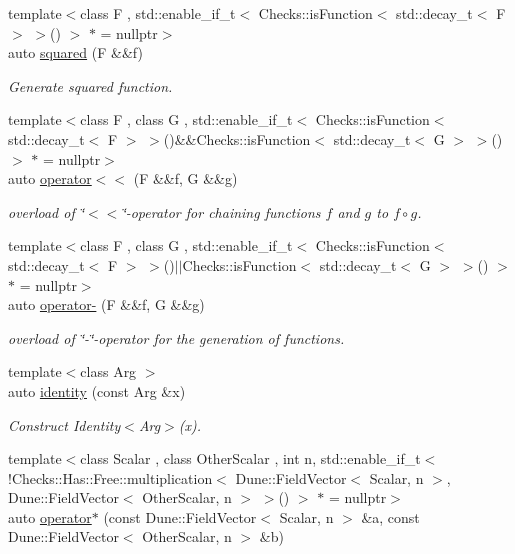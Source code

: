 \begin{DoxyCompactItemize}
{\footnotesize template$<$class F , std\-::enable\-\_\-if\-\_\-t$<$ Checks\-::is\-Function$<$ std\-::decay\-\_\-t$<$ F $>$ $>$() $>$ $\ast$  = nullptr$>$ }\\auto \hyperlink{namespaceFunG_ac4ffc0754104af6ddf114e154251db78}{squared} (F \&\&f)
\begin{DoxyCompactList}\small\item\em Generate squared function. \end{DoxyCompactList}\item 
{\footnotesize template$<$class F , class G , std\-::enable\-\_\-if\-\_\-t$<$ Checks\-::is\-Function$<$ std\-::decay\-\_\-t$<$ F $>$ $>$()\&\&\-Checks\-::is\-Function$<$ std\-::decay\-\_\-t$<$ G $>$ $>$() $>$ $\ast$  = nullptr$>$ }\\auto \hyperlink{namespaceFunG_a65436d4494e99629b0177d0df7634a6b}{operator$<$$<$} (F \&\&f, G \&\&g)
\begin{DoxyCompactList}\small\item\em overload of \char`\"{}$<$$<$\char`\"{}-\/operator for chaining functions $f$ and $g$ to $ f \circ g $. \end{DoxyCompactList}\item 
{\footnotesize template$<$class F , class G , std\-::enable\-\_\-if\-\_\-t$<$ Checks\-::is\-Function$<$ std\-::decay\-\_\-t$<$ F $>$ $>$()$\vert$$\vert$\-Checks\-::is\-Function$<$ std\-::decay\-\_\-t$<$ G $>$ $>$() $>$ $\ast$  = nullptr$>$ }\\auto \hyperlink{namespaceFunG_a3af04c2ef5c1b206feb75fffd298cbbf}{operator-\/} (F \&\&f, G \&\&g)
\begin{DoxyCompactList}\small\item\em overload of \char`\"{}-\/\char`\"{}-\/operator for the generation of functions. \end{DoxyCompactList}\item 
{\footnotesize template$<$class Arg $>$ }\\auto \hyperlink{namespaceFunG_a165e879e76d3a2a8906938f3658445ce}{identity} (const Arg \&x)
\begin{DoxyCompactList}\small\item\em Construct Identity$<$\-Arg$>$(x). \end{DoxyCompactList}\item 
{\footnotesize template$<$class Scalar , class Other\-Scalar , int n, std\-::enable\-\_\-if\-\_\-t$<$ !\-Checks\-::\-Has\-::\-Free\-::multiplication$<$ Dune\-::\-Field\-Vector$<$ Scalar, n $>$, Dune\-::\-Field\-Vector$<$ Other\-Scalar, n $>$ $>$() $>$ $\ast$  = nullptr$>$ }\\auto \hyperlink{namespaceFunG_a5e258023361844926f485229c62a733b}{operator$\ast$} (const Dune\-::\-Field\-Vector$<$ Scalar, n $>$ \&a, const Dune\-::\-Field\-Vector$<$ Other\-Scalar, n $>$ \&b)

\end{DoxyCompactItemize}
